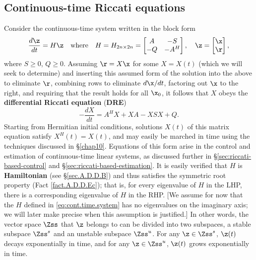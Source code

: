 \clearpage
\subsection{Continuous-time Riccati equations}\label{sec:CTRE}

Consider the continuous-time system written in the block form
\begin{equation}
  \frac{d\z}{dt} = H\z \quad \textrm{where} \quad H=H_{2n\times 2n}=\begin{bmatrix} A & -S \\ -Q & -A^H \end{bmatrix}, \quad
  \z=\begin{bmatrix} \x \\ \r \end{bmatrix},
\label{eq:cont.time.system}
\end{equation}
where $S\ge 0$, $Q\ge 0$.  Assuming $\r=X\x$ for some $X=X(t)$ (which we will seek to determine) and inserting this assumed form of the solution into the above
to eliminate $\r$, combining rows to eliminate $d{\x}/dt$, factoring
out $\x$ to the right, and requiring that the result holds for all
$\x_0$, it follows that $X$ obeys the {\bf differential Riccati equation} ({\bf DRE})
\begin{equation}
- \frac{d X}{dt} = A^H X + X A - X S X + Q.
\label{eq:cont.time.hamil}
\end{equation}
Starting from Hermitian initial conditions, solutions $X(t)$ of this matrix equation satisfy $X^H(t)=X(t)$,
and may easily be marched in time using the techniques discussed in \S \ref{chap10}.
Equations of this form arise in the control and estimation of continuous-time linear systems, as discussed further in \S \ref{sec:riccati-based-control}
and \S \ref{sec:riccati-based-estimation}.
It is easily verified that $H$ is {\bf Hamiltonian} (see \S \ref{sec.A.D.D.B}) and thus satisfies the 
symmetric root property (Fact \ref{fact.A.D.D.Ec}); that is, for every eigenvalue of $H$ in the LHP,
there is a corresponding eigenvalue of $H$ in the RHP.  
[We assume for now that the $H$ defined in \eqref{eq:cont.time.system} has no eigenvalues on the imaginary axis; we will later make precise when this assumption is justified.]
In other words, the vector space $\Zss$ that $\z$ belongs to can be divided into two subspaces,
a stable subspace $\Zss^s$ and an unstable subspace $\Zss^u$.  For any $\z\in\Zss^s$, $\z(t)$ decays exponentially in time, and
for any $\z\in\Zss^u$, $\z(t)$ grows exponentially in time.

